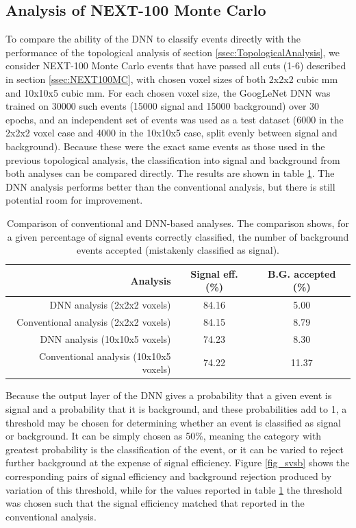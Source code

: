 \documentclass[a4paper,11pt]{article}
\begin{document}
\subsection{Analysis of NEXT-100 Monte Carlo}\label{ssec:NEXTMCanalysis}
To compare the ability of the DNN to classify events directly with the performance of the topological analysis of section \ref{ssec:TopologicalAnalysis}, we consider NEXT-100 Monte Carlo 
events that have passed all cuts (1-6) described in section \ref{ssec:NEXT100MC}, with chosen voxel sizes of both 2x2x2 cubic mm and 10x10x5 cubic mm.  For each chosen voxel size, the 
GoogLeNet DNN was trained on 30000 such events (15000 signal and 15000 background) over 30 epochs, 
and an independent set of events was used as a test dataset (6000 in the 2x2x2 voxel case and 4000 in the 10x10x5 case, split evenly between signal and background).  Because these were 
the exact same events as those used in the previous
topological analysis, the classification into signal and background from both analyses can be compared directly.  The results are shown in table \ref{tbl.DNNcomparison}.  The DNN
analysis performs better than the conventional analysis, but there is still potential room for improvement.  

\begin{table}[!htb]
	\begin{center}
		\caption[DNN analysis summary]{\label{tbl.DNNcomparison}Comparison of conventional and DNN-based analyses.  The comparison shows, for a given percentage of signal events
			correctly classified, the number of background events accepted (mistakenly classified as signal).}
		\begin{tabular}{rcc}
			\\
			\textbf{Analysis} & \textbf{Signal eff. (\%)} & \textbf{B.G. accepted (\%)}\\
			\hline
			DNN analysis (2x2x2 voxels) & 84.16 & 5.00\\
			Conventional analysis (2x2x2 voxels) & 84.15 & 8.79\\
			\hline
			DNN analysis (10x10x5 voxels) & 74.23 & 8.30\\
			Conventional analysis (10x10x5 voxels) & 74.22 & 11.37\\
		\end{tabular}
	\end{center}
\end{table}

Because the output layer of the DNN gives a probability that a given event is signal and a probability that it is background, and these probabilities add to 1, a threshold may be 
chosen for determining whether an event is classified as signal or background.  It can be simply chosen as 50\%, meaning the category with greatest probability is the classification of the
event, or it can be varied to reject further background at the expense of signal efficiency.  Figure \ref{fig_svsb} shows the corresponding pairs of signal efficiency and background 
rejection produced by variation of this threshold, while for the values reported in table \ref{tbl.DNNcomparison} the threshold was chosen such that the signal efficiency matched that reported in 
the conventional analysis.
\end{document}
